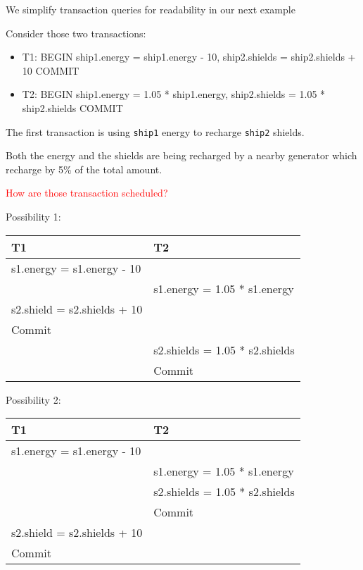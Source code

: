 \documentclass{beamer}
\newcommand{\red}[1]{
\textcolor{red}{#1}
}
\begin{document}
\begin{slide}{
\item We simplify transaction queries for readability in our next example  
\pause
\item Consider those two transactions:
\begin{itemize}
	\item T1:	BEGIN   ship1.energy = ship1.energy - 10, ship2.shields = ship2.shields + 10    COMMIT
	\item T2:	BEGIN   ship1.energy = 1.05 * ship1.energy,  ship2.shields = 1.05 * ship2.shields   COMMIT
\end{itemize}
\pause
\item The first transaction is using \texttt{ship1} energy to recharge \texttt{ship2} shields.  
\item Both the energy and the shields are being recharged by a nearby generator which recharge by 5\% of the total amount.
\item \red{How are those transaction scheduled?}	
}\end{slide}


\begin{slide}{
\item Possibility 1:
\begin{table}
	\tiny
	\begin{tabular}{l|l}
		T1 & T2\\
		\hline
		s1.energy = s1.energy - 10 & \\
		& s1.energy = 1.05 * s1.energy \\
		s2.shield = s2.shields + 10 & \\
		Commit & \\
		& s2.shields = 1.05 * s2.shields \\
		& Commit
	\end{tabular}
\end{table}
}\end{slide}

\begin{slide}{
		\item Possibility 2:
		\begin{table}
			\tiny
			\begin{tabular}{l|l}
				T1 & T2\\
				\hline
				s1.energy = s1.energy - 10 & \\
				& s1.energy = 1.05 * s1.energy \\
				& s2.shields = 1.05 * s2.shields \\
				& Commit \\	
				s2.shield = s2.shields + 10 & \\
				Commit & \\
			\end{tabular}
		\end{table}
}\end{slide}
\end{document}

